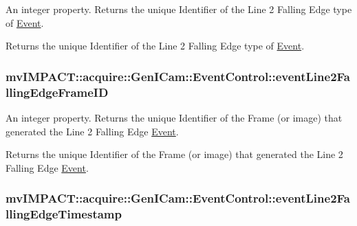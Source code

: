 An integer property. Returns the unique Identifier of the Line 2 Falling Edge type of \hyperlink{classmv_i_m_p_a_c_t_1_1acquire_1_1_event}{Event}. 

Returns the unique Identifier of the Line 2 Falling Edge type of \hyperlink{classmv_i_m_p_a_c_t_1_1acquire_1_1_event}{Event}. \hypertarget{classmv_i_m_p_a_c_t_1_1acquire_1_1_gen_i_cam_1_1_event_control_ad88e9f022bd27556b1edf452c8bf5655}{
\subsubsection[{event\+Line2\+Falling\+Edge\+Frame\+I\+D}]{ mv\+I\+M\+P\+A\+C\+T\+::acquire\+::\+Gen\+I\+Cam\+::\+Event\+Control\+::event\+Line2\+Falling\+Edge\+Frame\+I\+D}}\label{classmv_i_m_p_a_c_t_1_1acquire_1_1_gen_i_cam_1_1_event_control_ad88e9f022bd27556b1edf452c8bf5655}


An integer property. Returns the unique Identifier of the Frame (or image) that generated the Line 2 Falling Edge \hyperlink{classmv_i_m_p_a_c_t_1_1acquire_1_1_event}{Event}. 

Returns the unique Identifier of the Frame (or image) that generated the Line 2 Falling Edge \hyperlink{classmv_i_m_p_a_c_t_1_1acquire_1_1_event}{Event}. \hypertarget{classmv_i_m_p_a_c_t_1_1acquire_1_1_gen_i_cam_1_1_event_control_a4286ac193d81c9a1476fb8d6a670a9bf}{
\subsubsection[{event\+Line2\+Falling\+Edge\+Timestamp}]{ mv\+I\+M\+P\+A\+C\+T\+::acquire\+::\+Gen\+I\+Cam\+::\+Event\+Control\+::event\+Line2\+Falling\+Edge\+Timestamp}}\label{classmv_i_m_p_a_c_t_1_1acquire_1_1_gen_i_cam_1_1_event_control_a4286ac193d81c9a1476fb8d6a670a9bf}


